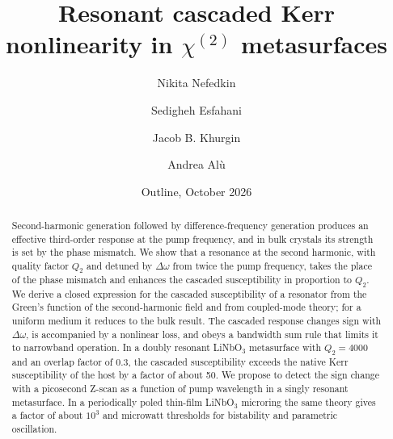 \documentclass[aps,prapplied,onecolumn,superscriptaddress,longbibliography,nofootinbib]{revtex4-2}
\newcommand{\Dom}{\Delta\omega}
\begin{document}
\title{Resonant cascaded Kerr nonlinearity in \texorpdfstring{$\chi^{(2)}$}{chi(2)} metasurfaces}

\author{Nikita Nefedkin}
\author{Sedigheh Esfahani}
\author{Jacob B. Khurgin}
\author{Andrea Al\`u}

\date{Outline, October 2026}

\begin{abstract}
Second-harmonic generation followed by difference-frequency generation
produces an effective third-order response at the pump frequency, and in
bulk crystals its strength is set by the phase mismatch.  We show that a
resonance at the second harmonic, with quality factor $Q_2$ and detuned by
$\Dom$ from twice the pump frequency, takes the place of the phase mismatch
and enhances the cascaded susceptibility in proportion to $Q_2$.  We derive
a closed expression for the cascaded susceptibility of a resonator from the
Green's function of the second-harmonic field and from coupled-mode theory;
for a uniform medium it reduces to the bulk result.  The cascaded response
changes sign with $\Dom$, is accompanied by a nonlinear loss, and obeys a
bandwidth sum rule that limits it to narrowband operation.  In a doubly
resonant LiNbO$_3$ metasurface with $Q_2=4000$ and an overlap factor of
$0.3$, the cascaded susceptibility exceeds the native Kerr susceptibility
of the host by a factor of about 50.  We propose to detect the sign change
with a picosecond Z-scan as a function of pump wavelength in a singly
resonant metasurface.  In a periodically poled thin-film LiNbO$_3$
microring the same theory gives a factor of about $10^3$ and microwatt
thresholds for bistability and parametric oscillation.
\end{abstract}

\maketitle

\end{document}
